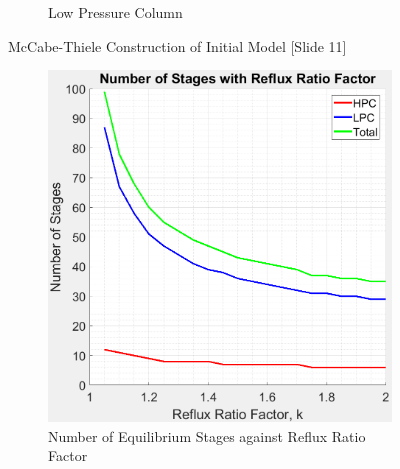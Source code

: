 \documentclass[11pt, oneside]{article}
\begin{document}
\begin{figure}[ht]
\begin{subfigure}{0.49\textwidth}
            \caption{Low Pressure Column}
            \label{fig:LPC_v0}
        \end{subfigure}
        \caption{McCabe-Thiele Construction of Initial Model [Slide 11]}
        \label{fig:mccabe_v0}
    \end{figure}
    
    \begin{figure}[ht]
        \begin{subfigure}{0.49\textwidth}
            \centering
            \includegraphics[width=\linewidth]{airseparation/handouts/graphics/graph-stages_vs_R_va.jpeg}
            \caption{Number of Equilibrium Stages against \newline Reflux Ratio Factor}
            \label{fig:stage_vs_R}
        \end{subfigure}
        \hspace*{\fill} %
        \begin{subfigure}{0.49\textwidth}
            \centering

\end{subfigure}
\end{figure}
\end{document}
